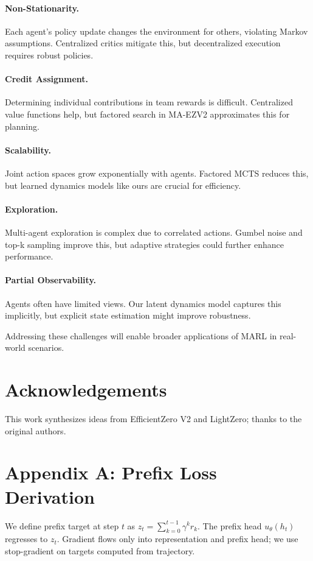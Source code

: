\documentclass{article}
\begin{document}
\paragraph{Non-Stationarity.} Each agent's policy update changes the environment for others, violating Markov assumptions. Centralized critics mitigate this, but decentralized execution requires robust policies.

\paragraph{Credit Assignment.} Determining individual contributions in team rewards is difficult. Centralized value functions help, but factored search in MA-EZV2 approximates this for planning.

\paragraph{Scalability.} Joint action spaces grow exponentially with agents. Factored MCTS reduces this, but learned dynamics models like ours are crucial for efficiency.

\paragraph{Exploration.} Multi-agent exploration is complex due to correlated actions. Gumbel noise and top-k sampling improve this, but adaptive strategies could further enhance performance.

\paragraph{Partial Observability.} Agents often have limited views. Our latent dynamics model captures this implicitly, but explicit state estimation might improve robustness.

Addressing these challenges will enable broader applications of MARL in real-world scenarios.

\section*{Acknowledgements}
This work synthesizes ideas from EfficientZero V2 and LightZero; thanks to the original authors.




\appendix
\section{Appendix A: Prefix Loss Derivation}
We define prefix target at step $t$ as $z_t=\sum_{k=0}^{t-1}\gamma^k r_k$. The prefix head $u_\theta(h_t)$ regresses to $z_t$. Gradient flows only into representation and prefix head; we use stop-gradient on targets computed from trajectory.
\end{document}
